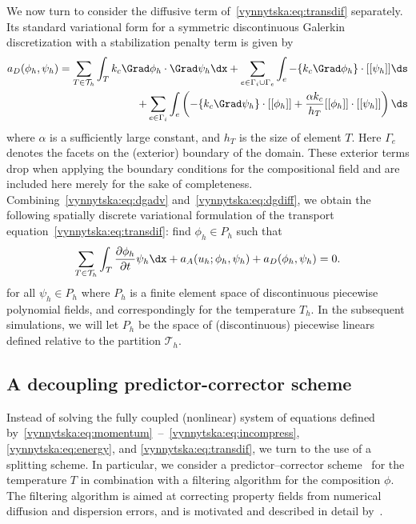 We now turn to consider the diffusive term
of~\eqref{vynnytska:eq:transdif} separately. Its standard variational
form for a symmetric discontinuous Galerkin discretization with a
stabilization penalty term is given by~\citep{Arnold1982,
KulkarniRovasTortorelli2007}
\begin{equation}
  \label{vynnytska:eq:dgdiff}
  \begin{split}
    a_D(\phi_h, \psi_h)
    =
    \sum_{T \in \mathcal{T}_h} \int_T k_c \Grad \phi_h \cdot \Grad \psi_h \dx
    + \sum_{e \in \Gamma_i \cup \Gamma_e}
    \int_{e} - \avg{k_c \Grad \phi_h} \cdot \jump{\psi_h} \ds \\
    + \sum_{e \in \Gamma_i} \int_{e} \left(
    - \{ k_c \Grad \psi_h\} \cdot \jump{\phi_h}
    + \frac{\alpha k_c}{h_T} \jump{\phi_h} \cdot \jump{\psi_h}
    \right) \ds
  \end{split}
\end{equation}
where $\alpha$ is a sufficiently large constant, and $h_T$ is the size
of element $T$. Here $\Gamma_e$ denotes the facets on the (exterior)
boundary of the domain. These exterior terms drop when applying the
boundary conditions for the compositional field and are included here
merely for the sake of
completeness. Combining~\eqref{vynnytska:eq:dgadv}
and~\eqref{vynnytska:eq:dgdiff}, we obtain the following spatially
discrete variational formulation of the transport
equation~\eqref{vynnytska:eq:transdif}: find $\phi_h \in P_h$ such
that
\begin{equation}
  \label{vynnytska:eq:semi_composition}
  \sum_{T \in \mathcal{T}_h} \int_T \frac{\partial \phi_h}{\partial t}\psi_h\dx
  + a_{A} (u_h; \phi_h, \psi_h) + a_D(\phi_h, \psi_h) = 0.
\end{equation}
for all $\psi_h \in P_h$ where $P_h$ is a finite element space of
discontinuous piecewise polynomial fields, and correspondingly for the
temperature $T_h$. In the subsequent simulations, we will let $P_h$ be
the space of (discontinuous) piecewise linears defined relative to the
partition $\mathcal{T}_h$.

\subsection{A decoupling predictor-corrector scheme}

Instead of solving the fully coupled (nonlinear) system of equations
defined
by~\eqref{vynnytska:eq:momentum}~--~\eqref{vynnytska:eq:incompress},
\eqref{vynnytska:eq:energy}, and \eqref{vynnytska:eq:transdif}, we
turn to the use of a splitting scheme. In particular, we consider a
predictor--corrector scheme~\citep{BergKekenYuen1993, HansenEbel1988}
for the temperature $T$ in combination with a filtering algorithm for
the composition $\phi$. The filtering algorithm is aimed at
correcting property fields from numerical diffusion and dispersion
errors, and is motivated and described in detail
by~\citet{LenardicKaula1993}.

